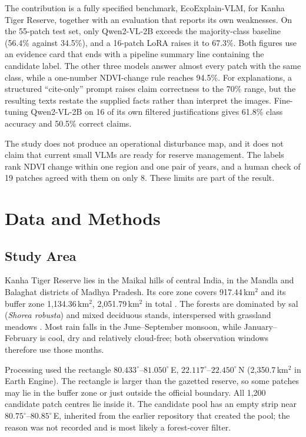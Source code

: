 \documentclass[11pt]{article}
\begin{document}
The contribution is a fully specified benchmark, EcoExplain-VLM, for
Kanha Tiger Reserve, together with an evaluation that reports its own
weaknesses. On the 55-patch test set, only Qwen2-VL-2B exceeds the
majority-class baseline (56.4\% against 34.5\%), and a 16-patch LoRA
raises it to 67.3\%. Both figures use an evidence card that ends with a
pipeline summary line containing the candidate label. The other three
models answer almost every patch with the same class, while a
one-number NDVI-change rule reaches 94.5\%. For explanations, a
structured ``cite-only'' prompt raises claim correctness to the 70\%
range, but the resulting texts restate the supplied facts rather than
interpret the images. Fine-tuning Qwen2-VL-2B on 16 of its own filtered
justifications gives 61.8\% class accuracy and 50.5\% correct claims.

The study does not produce an operational disturbance map, and it does
not claim that current small VLMs are ready for reserve management. The
labels rank NDVI change within one region and one pair of years, and a
human check of 19 patches agreed with them on only 8. These limits are
part of the result.


\section{Data and Methods}

\subsection{Study Area}

Kanha Tiger Reserve lies in the Maikal hills of central India, in the
Mandla and Balaghat districts of Madhya Pradesh. Its core zone covers
917.44\,km$^2$ and its buffer zone 1,134.36\,km$^2$, 2,051.79\,km$^2$ in
total \citep{kanha2026}. The forests are dominated by sal
(\emph{Shorea robusta}) and mixed deciduous stands, interspersed with
grassland meadows \citep{kanha2026}. Most rain falls in the
June--September monsoon, while January--February is cool, dry and
relatively cloud-free; both observation windows therefore use those
months.

Processing used the rectangle
$80.433^\circ$--$81.050^\circ$\,E,
$22.117^\circ$--$22.450^\circ$\,N (2,350.7\,km$^2$ in Earth Engine). The
rectangle is larger than the gazetted reserve, so some patches may lie
in the buffer zone or just outside the official boundary. All 1,200
candidate patch centres lie inside it. The candidate pool has an empty
strip near $80.75^\circ$--$80.85^\circ$\,E, inherited from the earlier
repository that created the pool; the reason was not recorded and is
most likely a forest-cover filter.
\end{document}
